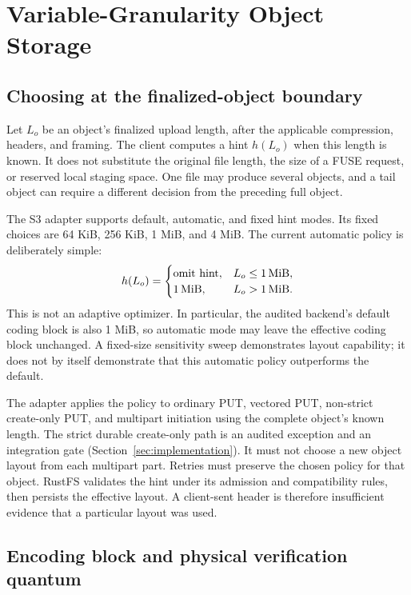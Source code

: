 \section{Variable-Granularity Object Storage}
\label{sec:layout}

\subsection{Choosing at the finalized-object boundary}

Let $L_o$ be an object's finalized upload length, after the applicable
compression, headers, and framing. The client computes a hint $h(L_o)$ when
this length is known. It does not substitute the original file length, the
size of a FUSE request, or reserved local staging space. One file may produce
several objects, and a tail object can require a different decision from the
preceding full object.

The S3 adapter supports default, automatic, and fixed hint modes. Its fixed
choices are 64 KiB, 256 KiB, 1 MiB, and 4 MiB. The current automatic policy is
deliberately simple:
\begin{equation}
h(L_o)=
\begin{cases}
\text{omit hint}, & L_o\leq 1\,\mathrm{MiB},\\
1\,\mathrm{MiB}, & L_o>1\,\mathrm{MiB}.
\end{cases}
\end{equation}
This is not an adaptive optimizer. In particular, the audited backend's
default coding block is also 1 MiB, so automatic mode may leave the effective
coding block unchanged. A fixed-size sensitivity sweep demonstrates layout
capability; it does not by itself demonstrate that this automatic policy
outperforms the default.

The adapter applies the policy to ordinary PUT, vectored PUT, non-strict
create-only PUT, and multipart initiation using the complete object's known
length. The strict durable create-only path is an audited exception and an
integration gate (Section~\ref{sec:implementation}).
It must not choose a new object layout from each multipart part. Retries
must preserve the chosen policy for that object. RustFS validates the hint
under its admission and compatibility rules, then persists the effective
layout. A client-sent header is therefore insufficient evidence that a
particular layout was used.

\subsection{Encoding block and physical verification quantum}

